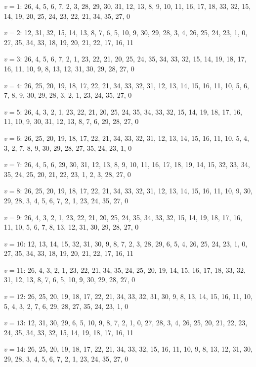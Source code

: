 \documentclass{amcjoucc}
\begin{document}
\begin{itemize}
{\footnotesize
\item $v = 1$: 26, 4, 5, 6, 7, 2, 3, 28, 29, 30, 31, 12, 13, 8, 9, 10, 11, 16, 17, 18, 33, 32, 15, 14, 19, 20, 25, 24, 23, 22, 21, 34, 35, 27, 0
\item $v = 2$: 12, 31, 32, 15, 14, 13, 8, 7, 6, 5, 10, 9, 30, 29, 28, 3, 4, 26, 25, 24, 23, 1, 0, 27, 35, 34, 33, 18, 19, 20, 21, 22, 17, 16, 11
\item $v = 3$: 26, 4, 5, 6, 7, 2, 1, 23, 22, 21, 20, 25, 24, 35, 34, 33, 32, 15, 14, 19, 18, 17, 16, 11, 10, 9, 8, 13, 12, 31, 30, 29, 28, 27, 0
\item $v = 4$: 26, 25, 20, 19, 18, 17, 22, 21, 34, 33, 32, 31, 12, 13, 14, 15, 16, 11, 10, 5, 6, 7, 8, 9, 30, 29, 28, 3, 2, 1, 23, 24, 35, 27, 0
\item $v = 5$: 26, 4, 3, 2, 1, 23, 22, 21, 20, 25, 24, 35, 34, 33, 32, 15, 14, 19, 18, 17, 16, 11, 10, 9, 30, 31, 12, 13, 8, 7, 6, 29, 28, 27, 0
\item $v = 6$: 26, 25, 20, 19, 18, 17, 22, 21, 34, 33, 32, 31, 12, 13, 14, 15, 16, 11, 10, 5, 4, 3, 2, 7, 8, 9, 30, 29, 28, 27, 35, 24, 23, 1, 0
\item $v = 7$: 26, 4, 5, 6, 29, 30, 31, 12, 13, 8, 9, 10, 11, 16, 17, 18, 19, 14, 15, 32, 33, 34, 35, 24, 25, 20, 21, 22, 23, 1, 2, 3, 28, 27, 0
\item $v = 8$: 26, 25, 20, 19, 18, 17, 22, 21, 34, 33, 32, 31, 12, 13, 14, 15, 16, 11, 10, 9, 30, 29, 28, 3, 4, 5, 6, 7, 2, 1, 23, 24, 35, 27, 0
\item $v = 9$: 26, 4, 3, 2, 1, 23, 22, 21, 20, 25, 24, 35, 34, 33, 32, 15, 14, 19, 18, 17, 16, 11, 10, 5, 6, 7, 8, 13, 12, 31, 30, 29, 28, 27, 0
\item $v = 10$: 12, 13, 14, 15, 32, 31, 30, 9, 8, 7, 2, 3, 28, 29, 6, 5, 4, 26, 25, 24, 23, 1, 0, 27, 35, 34, 33, 18, 19, 20, 21, 22, 17, 16, 11
\item $v = 11$: 26, 4, 3, 2, 1, 23, 22, 21, 34, 35, 24, 25, 20, 19, 14, 15, 16, 17, 18, 33, 32, 31, 12, 13, 8, 7, 6, 5, 10, 9, 30, 29, 28, 27, 0
\item $v = 12$: 26, 25, 20, 19, 18, 17, 22, 21, 34, 33, 32, 31, 30, 9, 8, 13, 14, 15, 16, 11, 10, 5, 4, 3, 2, 7, 6, 29, 28, 27, 35, 24, 23, 1, 0
\item $v = 13$: 12, 31, 30, 29, 6, 5, 10, 9, 8, 7, 2, 1, 0, 27, 28, 3, 4, 26, 25, 20, 21, 22, 23, 24, 35, 34, 33, 32, 15, 14, 19, 18, 17, 16, 11
\item $v = 14$: 26, 25, 20, 19, 18, 17, 22, 21, 34, 33, 32, 15, 16, 11, 10, 9, 8, 13, 12, 31, 30, 29, 28, 3, 4, 5, 6, 7, 2, 1, 23, 24, 35, 27, 0
}
\end{itemize}
\end{document}
